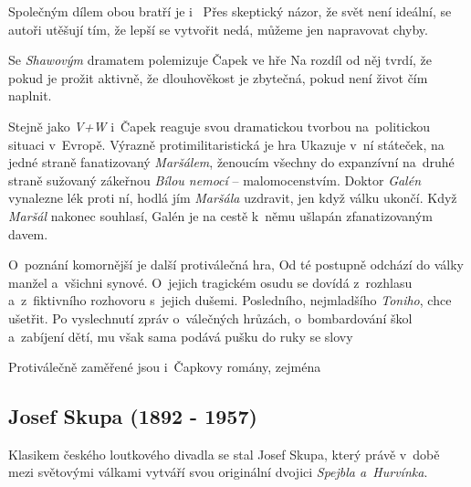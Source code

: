 Společným dílem obou bratří je i~ Přes skeptický
názor, že svět není ideální, se autoři utěšují tím, že lepší se vytvořit
nedá, můžeme jen napravovat chyby.

Se \emph{Shawovým} dramatem  polemizuje Čapek
ve hře  Na rozdíl od něj tvrdí, že
 pokud je prožit aktivně, že
dlouhověkost je zbytečná, pokud není život čím naplnit.

Stejně jako \emph{V+W} i~Čapek reaguje svou dramatickou tvorbou
na~politickou situaci v~Evropě. Výrazně protimilitaristická je hra
 Ukazuje v~ní státeček, na jedné straně fanatizovaný
\emph{Maršálem}, ženoucím všechny do expanzívní 
na~druhé straně sužovaný zákeřnou \emph{Bílou nemocí} -- malomocenstvím.
Doktor \emph{Galén} vynalezne lék proti ní, hodlá jím \emph{Maršála}
uzdravit, jen když válku ukončí. Když \emph{Maršál} nakonec souhlasí,
Galén je na cestě k~němu ušlapán zfanatizovaným davem.

O~poznání komornější je další protiválečná hra,  Od té
postupně odchází do války manžel a~všichni synové. O~jejich tragickém
osudu se dovídá z~rozhlasu a~z~fiktivního rozhovoru s~jejich dušemi.
Posledního, nejmladšího \emph{Toniho}, chce ušetřit. Po vyslechnutí
zpráv o~válečných hrůzách, o~bombardování škol a~zabíjení dětí, mu však
sama podává pušku do ruky se slovy 

Protiválečně zaměřené jsou i~Čapkovy romány, zejména 

\subsection*{Josef Skupa (1892 - 1957)}
Klasikem českého loutkového divadla se stal Josef Skupa, který právě
v~době mezi světovými válkami vytváří svou originální dvojici
\emph{Spejbla a~Hurvínka}. 